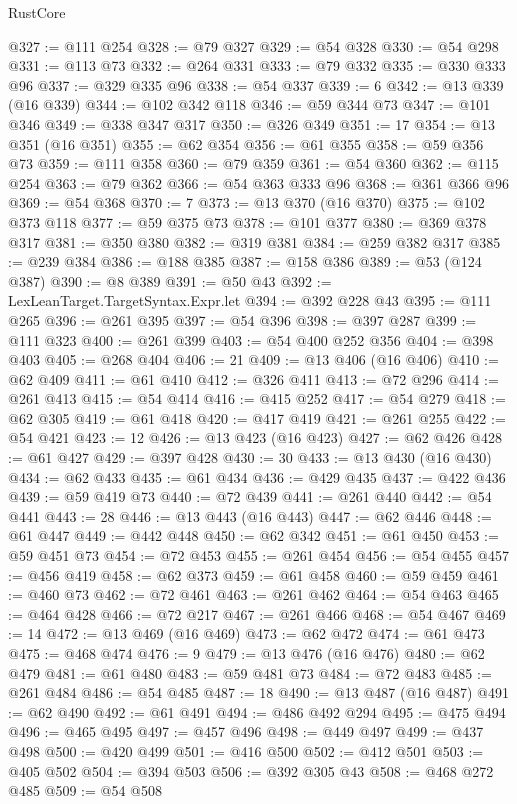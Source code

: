 \begin{lexlean}{RustCore}
\begin{coremodule}
@327 := @111 @254
@328 := @79 @327
@329 := @54 @328
@330 := @54 @298
@331 := @113 @73
@332 := @264 @331
@333 := @79 @332
@335 := @330 @333 @96
@337 := @329 @335 @96
@338 := @54 @337
@339 := 6
@342 := @13 @339 (@16 @339)
@344 := @102 @342 @118
@346 := @59 @344 @73
@347 := @101 @346
@349 := @338 @347 @317
@350 := @326 @349
@351 := 17
@354 := @13 @351 (@16 @351)
@355 := @62 @354
@356 := @61 @355
@358 := @59 @356 @73
@359 := @111 @358
@360 := @79 @359
@361 := @54 @360
@362 := @115 @254
@363 := @79 @362
@366 := @54 @363 @333 @96
@368 := @361 @366 @96
@369 := @54 @368
@370 := 7
@373 := @13 @370 (@16 @370)
@375 := @102 @373 @118
@377 := @59 @375 @73
@378 := @101 @377
@380 := @369 @378 @317
@381 := @350 @380
@382 := @319 @381
@384 := @259 @382 @317
@385 := @239 @384
@386 := @188 @385
@387 := @158 @386
@389 := @53 (@124 @387)
@390 := @8 @389
@391 := @50 @43
@392 := LexLeanTarget.TargetSyntax.Expr.let
@394 := @392 @228 @43
@395 := @111 @265
@396 := @261 @395
@397 := @54 @396
@398 := @397 @287
@399 := @111 @323
@400 := @261 @399
@403 := @54 @400 @252 @356
@404 := @398 @403
@405 := @268 @404
@406 := 21
@409 := @13 @406 (@16 @406)
@410 := @62 @409
@411 := @61 @410
@412 := @326 @411
@413 := @72 @296
@414 := @261 @413
@415 := @54 @414
@416 := @415 @252
@417 := @54 @279
@418 := @62 @305
@419 := @61 @418
@420 := @417 @419
@421 := @261 @255
@422 := @54 @421
@423 := 12
@426 := @13 @423 (@16 @423)
@427 := @62 @426
@428 := @61 @427
@429 := @397 @428
@430 := 30
@433 := @13 @430 (@16 @430)
@434 := @62 @433
@435 := @61 @434
@436 := @429 @435
@437 := @422 @436
@439 := @59 @419 @73
@440 := @72 @439
@441 := @261 @440
@442 := @54 @441
@443 := 28
@446 := @13 @443 (@16 @443)
@447 := @62 @446
@448 := @61 @447
@449 := @442 @448
@450 := @62 @342
@451 := @61 @450
@453 := @59 @451 @73
@454 := @72 @453
@455 := @261 @454
@456 := @54 @455
@457 := @456 @419
@458 := @62 @373
@459 := @61 @458
@460 := @59 @459
@461 := @460 @73
@462 := @72 @461
@463 := @261 @462
@464 := @54 @463
@465 := @464 @428
@466 := @72 @217
@467 := @261 @466
@468 := @54 @467
@469 := 14
@472 := @13 @469 (@16 @469)
@473 := @62 @472
@474 := @61 @473
@475 := @468 @474
@476 := 9
@479 := @13 @476 (@16 @476)
@480 := @62 @479
@481 := @61 @480
@483 := @59 @481 @73
@484 := @72 @483
@485 := @261 @484
@486 := @54 @485
@487 := 18
@490 := @13 @487 (@16 @487)
@491 := @62 @490
@492 := @61 @491
@494 := @486 @492 @294
@495 := @475 @494
@496 := @465 @495
@497 := @457 @496
@498 := @449 @497
@499 := @437 @498
@500 := @420 @499
@501 := @416 @500
@502 := @412 @501
@503 := @405 @502
@504 := @394 @503
@506 := @392 @305 @43
@508 := @468 @272 @485
@509 := @54 @508

\end{coremodule}
\end{lexlean}
